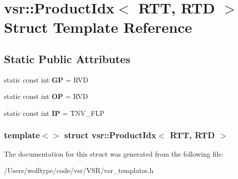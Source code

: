 \hypertarget{structvsr_1_1_product_idx_3_01_r_t_t_00_01_r_t_d_01_4}{\section{vsr\-:\-:Product\-Idx$<$ R\-T\-T, R\-T\-D $>$ Struct Template Reference}
\label{structvsr_1_1_product_idx_3_01_r_t_t_00_01_r_t_d_01_4}
}
\subsection*{Static Public Attributes}
\begin{DoxyCompactItemize}
\item 
\hypertarget{structvsr_1_1_product_idx_3_01_r_t_t_00_01_r_t_d_01_4_ad65e5f030aea2f45d0faae7d63d4d00e}{static const int {\bfseries G\-P} = R\-V\-D}\label{structvsr_1_1_product_idx_3_01_r_t_t_00_01_r_t_d_01_4_ad65e5f030aea2f45d0faae7d63d4d00e}

\item 
\hypertarget{structvsr_1_1_product_idx_3_01_r_t_t_00_01_r_t_d_01_4_a1d299d5de7011c1004e57e8dcc7f5281}{static const int {\bfseries O\-P} = R\-V\-D}\label{structvsr_1_1_product_idx_3_01_r_t_t_00_01_r_t_d_01_4_a1d299d5de7011c1004e57e8dcc7f5281}

\item 
\hypertarget{structvsr_1_1_product_idx_3_01_r_t_t_00_01_r_t_d_01_4_a708b177f7ffdd66a3776a8b125195776}{static const int {\bfseries I\-P} = T\-N\-V\-\_\-\-F\-L\-P}\label{structvsr_1_1_product_idx_3_01_r_t_t_00_01_r_t_d_01_4_a708b177f7ffdd66a3776a8b125195776}

\end{DoxyCompactItemize}
\subsubsection*{template$<$$>$ struct vsr\-::\-Product\-Idx$<$ R\-T\-T, R\-T\-D $>$}



The documentation for this struct was generated from the following file\-:\begin{DoxyCompactItemize}
\item 
/\-Users/wolftype/code/vsr/\-V\-S\-R/vsr\-\_\-templates.\-h\end{DoxyCompactItemize}
